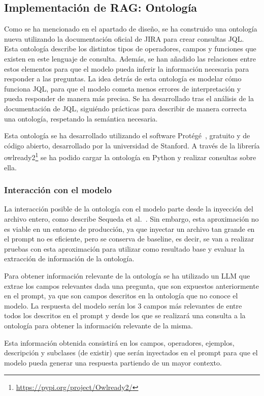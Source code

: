 \subsection{Implementación de RAG: Ontología}
Como se ha mencionado en el apartado de diseño, se ha construido una ontología nueva utilizando la documentación oficial de JIRA para crear consultas JQL. Esta ontología describe los distintos tipos de operadores, campos y funciones que existen en este lenguaje de consulta. Además, se han añadido las relaciones entre estos elementos para que el modelo pueda inferir la información necesaria para responder a las preguntas. La idea detrás de esta ontología es modelar cómo funciona JQL, para que el modelo cometa menos errores de interpretación y pueda responder de manera más precisa. Se ha desarrollado tras el análisis de la documentación de JQL, siguiéndo prácticas para describir de manera correcta una ontología, respetando la semántica necesaria.

Esta ontología se ha desarrollado utilizando el software Protégé~\cite{protege}, gratuito y de código abierto, desarrollado por la universidad de Stanford. A través de la librería owlready2\footnote{\url{https://pypi.org/project/Owlready2/}} se ha podido cargar la ontología en Python y realizar consultas sobre ella. 

\subsubsection{Interacción con el modelo}
La interacción posible de la ontología con el modelo parte desde la inyección del archivo entero, como describe Sequeda et al.~\cite{sequeda2023benchmark}. Sin embargo, esta aproximación no es viable en un entorno de producción, ya que inyectar un archivo tan grande en el prompt no es eficiente, pero se conserva de baseline, es decir, se van a realizar pruebas con esta aproximación para utilizar como resultado base y evaluar la extracción de información de la ontología. 

Para obtener información relevante de la ontología se ha utilizado un LLM que extrae los campos relevantes dada una pregunta, que son expuestos anteriormente en el prompt, ya que son campos descritos en la ontología que no conoce el modelo. La respuesta del modelo serán los 3 campos más relevantes de entre todos los descritos en el prompt y desde los que se realizará una consulta a la ontología para obtener la información relevante de la misma.

Esta información obtenida consistirá en los campos, operadores, ejemplos, descripción y subclases (de existir) que serán inyectados en el prompt para que el modelo pueda generar una respuesta partiendo de un mayor contexto.

